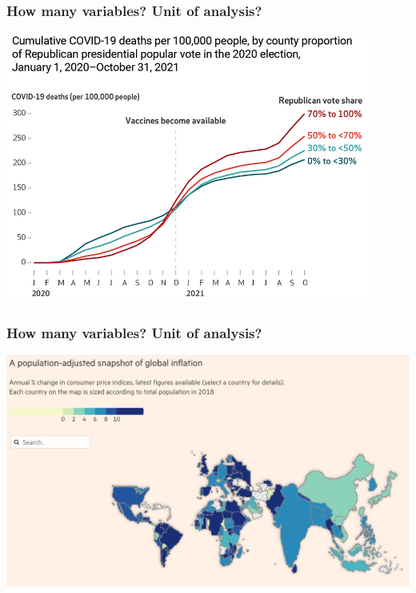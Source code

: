 \documentclass[aspectratio=43]{beamer}
\begin{document}

\begin{frame}
\frametitle{How many variables? Unit of analysis?}
\centering

\includegraphics[width = 0.9\textwidth]{../img/covid_vote}

\end{frame}

\begin{frame}
\frametitle{How many variables? Unit of analysis?}
\centering

\includegraphics[width = \textwidth]{../img/global_inflation_ft}

\end{frame}
\end{document}
